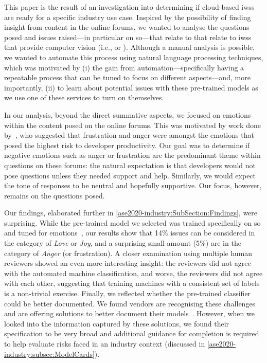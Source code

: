 This paper is the result of an investigation into determining if cloud-based \glspl{iws} are ready for a specific industry use case. Inspired by the possibility of finding insight from content in the online forums, we wanted to analyse the questions posed and issues raised---in particular on \gls{so}---that relate to that relate to  \glspl{iws} that provide computer vision (i.e.,  or ).  Although a manual analysis is possible, we wanted to automate this process using natural language processing techniques, which was motivated by (i) the gain from automation---specifically having a repeatable process that can be tuned to focus on different aspects---and, more importantly, (ii) to learn about potential issues with these pre-trained models as we use one of these services to turn on themselves.

In our analysis, beyond the direct summative aspects, we focused on emotions within the content posed on the online forums. This was motivated by work done by~\citet{wrobel2013}, who suggested that frustration and anger were amongst the emotions that posed the highest risk to developer productivity. Our goal was to determine if negative emotions such as anger or frustration are the predominant theme within questions on these forums: the natural expectation is that developers would not pose questions unless they needed support and help. Similarly, we would expect the tone of responses to be neutral and hopefully supportive. Our focus, however, remains on the questions posed.

Our findings, elaborated further in  \cref{ase2020-industry:SubSection:Findings}, were surprising. While the pre-trained model we selected was trained specifically on \gls{so} and tuned for emotions~\citep{novielli2018,calefato2017}, our results show that 14\% issues can be considered in the category of \textit{Love} or \textit{Joy}, and a surprising small amount (5\%) are in the category of \textit{Anger} (or frustration). A closer examination using multiple human reviewers showed an even more interesting insight: the reviewers did not agree with the automated machine classification, and worse, the reviewers did not agree with each other, suggesting that training machines with a consistent set of labels is a non-trivial exercise.  Finally, we reflected whether the pre-trained classifier could be better documented.  We found vendors are recognising these challenges and are offering solutions to better document their models~\citep{Mitchell:2018in, Gebru:2018wh}. However, when we looked into the information captured by these solutions, we found their specification to be very broad and additional guidance for completion is required to help evaluate risks faced in an industry context (discussed in \cref{ase2020-industry:subsec:ModelCards}).


